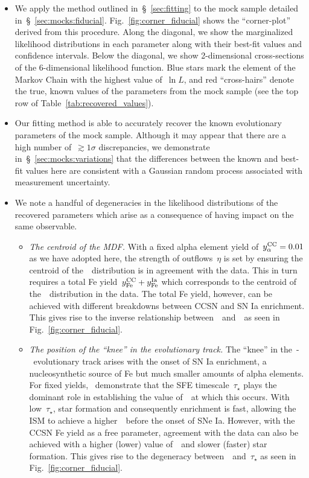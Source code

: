 \documentclass[ms.tex]{subfiles}
\begin{document}
\begin{itemize}

	\item We apply the method outlined in~\S~\ref{sec:fitting} to the
	mock sample detailed in~\S~\ref{sec:mocks:fiducial}.
	Fig.~\ref{fig:corner_fiducial} shows the ``corner-plot'' derived from this
	procedure.
	Along the diagonal, we show the marginalized likelihood distributions in
	each parameter along with their best-fit values and confidence intervals.
	Below the diagonal, we show 2-dimensional cross-sections of the
	6-dimensional likelihood function.
	Blue stars mark the element of the Markov Chain with the highest value
	of~$\ln L$, and red ``cross-hairs'' denote the true, known values of the
	parameters from the mock sample (see the top row of
	Table~\ref{tab:recovered_values}).

	\item Our fitting method is able to accurately recover the known
	evolutionary parameters of the mock sample.
	Although it may appear that there are a high number of~$\gtrsim1\sigma$
	discrepancies, we demonstrate in~\S~\ref{sec:mocks:variations} that the
	differences between the known and best-fit values here are consistent with
	a Gaussian random process associated with measurement uncertainty.

	\item We note a handful of degeneracies in the likelihood distributions of
	the recovered parameters which arise as a consequence of having impact on
	the same observable.

	\begin{itemize}

		\item \textit{The centroid of the MDF.}
		With a fixed alpha element yield of~$y_\alpha^\text{CC} = 0.01$ as we have adopted
		here, the strength of outflows~$\eta$ is set by ensuring the centroid
		of the~\ah~distribution is in agreement with the data.
		This in turn requires a total Fe yield~$y_\text{Fe}^\text{CC} + y_\text{Fe}^\text{Ia}$ which
		corresponds to the centroid of the~\feh~distribution in the data.
		The total Fe yield, however, can be achieved with different breakdowns
		between CCSN and SN Ia enrichment.
		This gives rise to the inverse relationship between~\yfecc~and~\yfeia~as
		seen in Fig.~\ref{fig:corner_fiducial}.

		\item \textit{The position of the ``knee'' in the evolutionary track.}
		The ``knee'' in the~\afe-\feh~evolutionary track arises with the onset
		of SN Ia enrichment, a nucleosynthetic source of Fe but much smaller
		amounts of alpha elements.
		For fixed yields,~\citet{Weinberg2017} demonstrate that the SFE
		timescale~$\tau_\star$ plays the dominant role in establishing the
		value of~\feh~at which this occurs.
		With low~$\tau_\star$, star formation and consequently enrichment is
		fast, allowing the ISM to achieve a higher~\feh~before the onset of
		SNe Ia.
		However, with the CCSN Fe yield as a free parameter, agreement with the
		data can also be achieved with a higher (lower) value of~\yfecc~and
		slower (faster) star formation.
		This gives rise to the degeneracy between~\yfecc~and~$\tau_\star$ as
		seen in Fig.~\ref{fig:corner_fiducial}.


\end{itemize}
\end{itemize}
\end{document}
